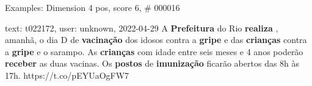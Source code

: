 \begin{frame}{Examples: Dimension 4 pos, score 6, \# 000016}
\footnotesize
\begin{exampleblock}{text: t022172, user: unknown, 2022-04-29}
A \textbf{Prefeitura} do Rio \textbf{realiza} , amanhã, o dia D de 
\textbf{vacinação} dos idosos contra a \textbf{gripe} e das \textbf{crianças} 
contra a \textbf{gripe} e o sarampo. As \textbf{crianças} com idade entre seis 
meses e 4 anos poderão \textbf{receber} as duas vacinas. Os \textbf{postos} de 
\textbf{imunização} ficarão abertos das 8h às 17h. https://t.co/pEYUaOgFW7 
\end{exampleblock}
\end{frame}
